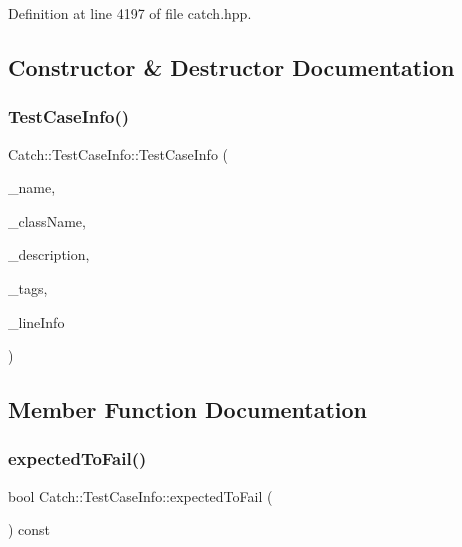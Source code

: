 Definition at line 4197 of file catch.\+hpp.



\subsection{Constructor \& Destructor Documentation}
\mbox{\label{struct_catch_1_1_test_case_info_ad1a6b08b5a83d1c5eb4596b727b5305f}} 
\subsubsection{TestCaseInfo()}
{\footnotesize\ttfamily Catch\+::\+Test\+Case\+Info\+::\+Test\+Case\+Info (\begin{DoxyParamCaption}\item[{std\+::string const \&}]{\+\_\+name,  }\item[{std\+::string const \&}]{\+\_\+class\+Name,  }\item[{std\+::string const \&}]{\+\_\+description,  }\item[{std\+::vector$<$ std\+::string $>$ const \&}]{\+\_\+tags,  }\item[{\textbf{ Source\+Line\+Info} const \&}]{\+\_\+line\+Info }\end{DoxyParamCaption})}



\subsection{Member Function Documentation}
\mbox{\label{struct_catch_1_1_test_case_info_abe33d81233230cdae8afa714688e905b}} 
\subsubsection{expectedToFail()}
{\footnotesize\ttfamily bool Catch\+::\+Test\+Case\+Info\+::expected\+To\+Fail (\begin{DoxyParamCaption}{ }\end{DoxyParamCaption}) const}

\mbox{\label{struct_catch_1_1_test_case_info_a934b1a0952700743e99d62ec1731a2e2}} 
